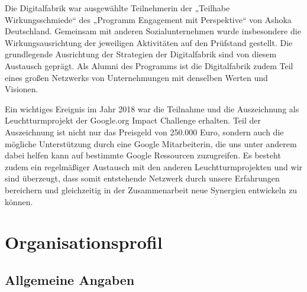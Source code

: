 \documentclass[12pt, a4paper]{article} %
\begin{document}
Die Digitalfabrik war ausgewählte Teilnehmerin der „Teilhabe
Wirkungsschmiede“ des „Programm Engagement mit Perspektive“ von Ashoka
Deutschland. Gemeinsam mit anderen Sozialunternehmen wurde insbesondere
die Wirkungsausrichtung der jeweiligen Aktivitäten auf den Prüfstand
gestellt. Die grundlegende Ausrichtung der Strategien der Digitalfabrik
sind von diesem Austausch geprägt. Als Alumni des Programms ist die
Digitalfabrik zudem Teil eines großen Netzwerks von Unternehmungen mit
denselben Werten und Visionen.

Ein wichtiges Ereignis im Jahr 2018 war die Teilnahme und die
Auszeichnung als Leuchtturmprojekt der Google.org Impact Challenge
erhalten. Teil der Auszeichnung ist nicht nur das Preisgeld von 250.000
Euro, sondern auch die mögliche Unterstützung durch eine Google
Mitarbeiterin, die uns unter anderem dabei helfen kann auf bestimmte
Google Ressourcen zuzugreifen. Es besteht zudem ein regelmäßiger
Austausch mit den anderen Leuchtturmprojekten und wir sind überzeugt,
dass somit entstehende Netzwerk durch unsere Erfahrungen bereichern und
gleichzeitig in der Zusammenarbeit neue Synergien entwickeln zu können.

\hypertarget{organisationsprofil}{%
\section{Organisationsprofil}\label{organisationsprofil}}

\hypertarget{allgemeine-angaben}{%
\subsection{Allgemeine Angaben}\label{allgemeine-angaben}}
\end{document}
